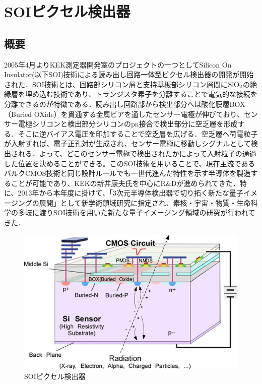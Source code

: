 \chapter{SOIピクセル検出器}

\section{概要}

2005年4月よりKEK測定器開発室のプロジェクトの一つとしてSilicon On Insulator(以下SOI)技術による読み出し回路一体型ピクセル検出器の開発が開始された．SOI技術とは、回路部シリコン層と支持基板部シリコン層間に${\rm SiO_2}$の絶縁層を埋め込む技術であり、トランジスタ素子を分離することで電気的な接続を分離できるのが特徴である．読み出し回路部から検出部分へは酸化膜層BOX（Buried OXide）を貫通する金属ビアを通したセンサー電極が伸びており、センサー電極シリコンと検出部分シリコンのpn接合で検出部分に空乏層を形成する．そこに逆バイアス電圧を印加することで空乏層を広げる．空乏層へ荷電粒子が入射すれば、電子正孔対が生成され、センサー電極に移動しシグナルとして検出される．よって、どこのセンサー電極で検出されたかによって入射粒子の通過した位置を決めることができる。このSOI技術を用いることで、現在主流であるバルクCMOS技術と同じ設計ルールでも一世代進んだ特性を示す半導体を製造することが可能であり、KEKの新井康夫氏を中心にR$\&$Dが進められてきた．特に、2013年から本年度に掛けて、「3次元半導体検出器で切り拓く新たな量子イメージングの展開」として新学術領域研究に指定され、素核・宇宙・物質・生命科学の多岐に渡りSOI技術を用いた新たな量子イメージング領域の研究が行われてきた．

\begin{figure}[htbp]
			\begin{center}
				\includegraphics[width=12.0cm]{./Chapter/Chapter3/Picture/SOIPIX.png}
				\caption{SOIピクセル検出器}
				\label{fig:SOIPIX}
			\end{center}
		\end{figure}

